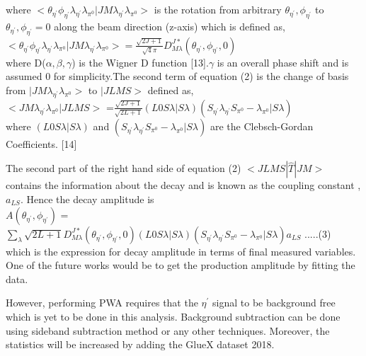 \documentclass[11pt]{article}
\begin{document}
     where $<\theta_{\eta^{'}}\phi_{\eta^{'}}\lambda_{\eta^{'}}\lambda_{\pi^{0}} |JM\lambda_{\eta^{'}}\lambda_{\pi^{0}}>$ is the rotation from arbitrary $\theta_{\eta^{'}},\phi_{\eta^{'}} $ to $ \theta_{\eta^{'}},\phi_{\eta^{'}} = 0$ along the beam direction (z-axis) which  is defined as, \\
     
     $<\theta_{\eta^{'}}\phi_{\eta^{'}}\lambda_{\eta^{'}}\lambda_{\pi^{0}} |JM\lambda_{\eta^{'}}\lambda_{\pi^{0}}> = \frac{\sqrt{2J+1}} {\sqrt4\pi} D_{M\lambda}^ {J*} (\theta_{\eta^{'}}, \phi_{\eta^{'}}, 0)$\\
    
     where  D($\alpha, \beta, \gamma$) is the Wigner D function [13].$ \gamma$ is an overall phase shift and is assumed 0 for simplicity.The second term of equation (2) is the change of basis from $|JM\lambda_{\eta^{'}}\lambda_{\pi^{0}}>$ to $|JLMS>$ defined as,\\
     
     $<JM\lambda_{\eta^{'}}\lambda_{\pi^{0}}|JLMS>$ =$ \frac{\sqrt{2J+1}} {\sqrt{2L+1}} (L0S\lambda|S\lambda) (S_{\eta^{'}} \lambda_{\eta^{'}} S_{\pi^{0}} - \lambda_{\pi^{0}}|S\lambda)$\\
     
     where $(L0S\lambda|S\lambda)$  and $(S_{\eta^{'}} \lambda_{\eta^{'}} S_{\pi^{0}} - \lambda_{\pi^{0}}|S\lambda)$ are the Clebsch-Gordan Coefficients. [14]
     
     The second part of the right hand side of  equation (2) $<JLMS | \widehat{T}|JM>$ contains the information about the decay and is known as the coupling constant , $a_{LS}$. Hence the decay amplitude is \\
     
     $A(\theta_{\eta^{'}},\phi_{\eta^{'}})$ = $\sum_{\lambda} {} {{\sqrt{2L+1}} D_{M\lambda}^ {J*} (\theta_{\eta^{'}}, \phi_{\eta^{'}}, 0)} (L0S\lambda|S\lambda) (S_{\eta^{'}} \lambda_{\eta^{'}} S_{\pi^{0}} - \lambda_{\pi^{0}}|S\lambda) a_{LS}$   .....(3)\\
     
     which is the expression for decay amplitude in terms of final measured variables. One of the future works would be to get the production amplitude by fitting the data.
     
 However, performing PWA requires that the  $\eta^{'}$ signal to be background free which is yet to be done in this analysis. Background subtraction can be done using sideband subtraction method or any other techniques. Moreover, the statistics will be increased by adding the GlueX dataset 2018. \\
\end{document}
